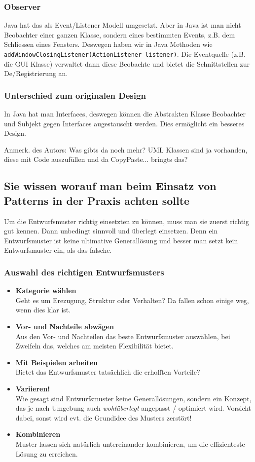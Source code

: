 \subsubsection{Observer}
Java hat das als Event/Listener Modell umgesetzt. Aber in Java ist man nicht Beobachter einer ganzen Klasse, sondern eines bestimmten Events, z.B. dem Schliessen eines Fensters. Deswegen haben wir in Java Methoden wie \texttt{addWindowClosingListener(ActionListener listener)}. Die Eventquelle (z.B. die GUI Klasse) verwaltet dann diese Beobachte und bietet die Schnittstellen zur De/Registrierung an. 
\subsubsection{Unterschied zum originalen Design}
In Java hat man Interfaces, deswegen können die Abstrakten Klasse Beobachter und Subjekt gegen Interfaces augestauscht werden. Dies ermöglicht ein besseres Design.

Anmerk. des Autors: Was gibts da noch mehr? UML Klassen sind ja vorhanden, diese mit Code auszufüllen und da CopyPaste... bringts das?

\subsection{Sie wissen worauf man beim Einsatz von Patterns in der Praxis achten sollte}
Um die Entwurfsmuster richtig einsetzten zu können, muss man sie zuerst richtig gut kennen. Dann unbedingt sinnvoll und überlegt einsetzen. Denn ein Entwurfsmuster ist keine ultimative Generallösung und besser man setzt kein Entwurfsmuster ein, als das falsche.
\subsubsection{Auswahl des richtigen Entwurfsmusters}
\begin{itemize}
  \item \textbf{Kategorie wählen} \\
  Geht es um Erezugung, Struktur oder Verhalten? Da fallen schon einige weg, wenn dies klar ist.
  \item \textbf{Vor- und Nachteile abwägen} \\
  Aus den Vor- und Nachteilen das beste Entwurfsmuster auswählen, bei Zweifeln das, welches am meisten Flexibilität bietet.
  \item \textbf{Mit Beispielen arbeiten} \\
  Bietet das Entwurfsmuster tatsächlich die erhofften Vorteile?
  \item \textbf{Variieren!} \\
  Wie gesagt sind Entwurfsmuster keine Generallösungen, sondern ein Konzept, das je nach Umgebung auch \emph{wohlüberlegt} angepasst / optimiert wird. Vorsicht dabei, sonst wird evt. die Grundidee des Musters zerstört!
  \item \textbf{Kombinieren} \\
  Muster lassen sich natürlich untereinander kombinieren, um die effizienteste Lösung zu erreichen. 
\end{itemize}

